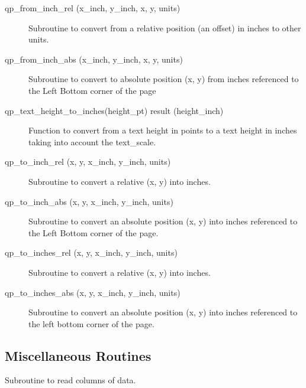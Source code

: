 \begin{description}

\label{r:qp.from.inch.rel}
\item[qp_from_inch_rel (x_inch, y_inch, x, y, units)] \Newline 
     Subroutine to convert from a relative position (an offset) in inches
     to other units.

\label{r:qp.from.inch.abs}
\item[qp_from_inch_abs (x_inch, y_inch, x, y, units)] \Newline 
     Subroutine to convert to absolute position (x, y) from inches referenced
     to the Left Bottom corner of the page

\label{r:qp.text.height.to.inches}
\item[qp_text_height_to_inches(height_pt) result (height_inch)] \Newline 
Function to convert from a text height in points to a text height in
inches taking into account the text_scale.

\label{r:qp.to.inch.rel}
\item[qp_to_inch_rel (x, y, x_inch, y_inch, units)] \Newline 
Subroutine to convert a relative (x, y) into inches.

\label{r:qp.to.inch.abs}
\item[qp_to_inch_abs (x, y, x_inch, y_inch, units)] \Newline 
Subroutine to convert an absolute position (x, y) into inches referenced
to the Left Bottom corner of the page.

\label{r:qp.to.inches.rel}
\item[qp_to_inches_rel (x, y, x_inch, y_inch, units)] \Newline 
     Subroutine to convert a relative (x, y) into inches.

\label{r:qp.to.inches.abs}
\item[qp_to_inches_abs (x, y, x_inch, y_inch, units)] \Newline 
     Subroutine to convert an absolute position (x, y) into inches referenced
     to the left bottom corner of the page.

\end{description}

\subsection{Miscellaneous Routines}

\begin{description}

\label{r:qp.read.data}
\item[qp_read_data (iu, err_flag, x, ix_col, y, iy_col, z, iz_col, 
                                                               t, it_col)] \Newline 
     Subroutine to read columns of data.

\end{description}

